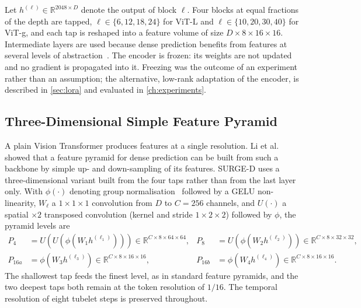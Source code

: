 Let $h^{(\ell)}\in\mathbb{R}^{2048\times D}$ denote the output of block
$\ell$. Four blocks at equal fractions of the depth are tapped, $\ell\in\{6,12,18,24\}$
for \acrshort{ViT}-L and $\ell\in\{10,20,30,40\}$ for \acrshort{ViT}-g, and each tap is reshaped into
a feature volume of size $D\times8\times16\times16$. Intermediate layers are
used because dense prediction benefits from features at several levels of
abstraction~\cite{lin2017feature,ranftl2021vision}. The encoder is frozen: its
weights are not updated and no gradient is propagated into it. Freezing was
the outcome of an experiment rather than an assumption; the alternative,
low-rank adaptation of the encoder, is described in \cref{sec:lora} and
evaluated in \cref{ch:experiments}.

\subsection{Three-Dimensional Simple Feature Pyramid}

A plain Vision Transformer produces features at a single resolution. Li et
al.~\cite{li2022exploring} showed that a feature pyramid for dense prediction
can be built from such a backbone by simple up- and down-sampling of its
features. SURGE-D uses a three-dimensional variant built from the four
taps rather than from the last layer only. With $\phi(\cdot)$ denoting group
normalisation~\cite{wu2018group} followed by a \acrshort{GELU} non-linearity,
$W_\ell$ a $1\times1\times1$ convolution from $D$ to $C=256$ channels, and
$U(\cdot)$ a spatial $\times2$ transposed convolution (kernel and stride
$1\times2\times2$) followed by $\phi$, the pyramid levels are
\begin{equation}
\begin{aligned}
  P_4 &= U\!\left(U\!\left(\phi(W_{1}h^{(\ell_1)})\right)\right) \in\mathbb{R}^{C\times8\times64\times64},&
  P_8 &= U\!\left(\phi(W_{2}h^{(\ell_2)})\right) \in\mathbb{R}^{C\times8\times32\times32},\\
  P_{16a} &= \phi(W_{3}h^{(\ell_3)}) \in\mathbb{R}^{C\times8\times16\times16},&
  P_{16b} &= \phi(W_{4}h^{(\ell_4)}) \in\mathbb{R}^{C\times8\times16\times16}.
\end{aligned}
\label{eq:fpn}
\end{equation}
The shallowest tap feeds the finest level, as in standard feature pyramids,
and the two deepest taps both remain at the token resolution of $1/16$. The
temporal resolution of eight tubelet steps is preserved throughout.

